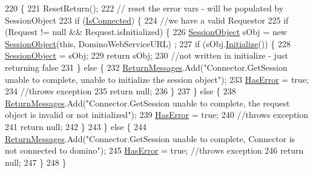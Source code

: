 \begin{DoxyCode}
220                                                                 \{
221         ResetReturn();
222         \textcolor{comment}{// reset the error vars - will be populated by SessionObject}
223         \textcolor{keywordflow}{if} (\mbox{\hyperlink{class_connector_a7e4bd5a6b59b228b169066b5f5ed4b0a}{IsConnected}}) \{
224             \textcolor{comment}{//we have a valid Requestor}
225             \textcolor{keywordflow}{if} (Request != null && Request.isInitialized) \{
226                 \mbox{\hyperlink{class_session_object}{SessionObject}} sObj = \textcolor{keyword}{new} \mbox{\hyperlink{class_connector_a0a7bb42f9530796c086ab50785147ce9}{SessionObject}}(\textcolor{keyword}{this}, DominoWebServiceURL)
      ;
227                 \textcolor{keywordflow}{if} (sObj.\mbox{\hyperlink{class_session_object_af3b9c9d56d98c848061952ed935f815b}{Initialize}}()) \{
228                     \mbox{\hyperlink{class_session_object}{SessionObject}} = sObj;
229                     \textcolor{keywordflow}{return} sObj;
230                     \textcolor{comment}{//not written in initialize - just returning false}
231                 \} \textcolor{keywordflow}{else} \{
232                     \mbox{\hyperlink{class_connector_a1ed422674b344524fd77998dcf6a9ba6}{ReturnMessages}}.Add(\textcolor{stringliteral}{"Connector.GetSession unable to complete, unable to
       initialize the session object"});
233                     \mbox{\hyperlink{class_connector_a9365777a6b7b711b75bcfa6c4d53e989}{HasError}} = \textcolor{keyword}{true};
234                     \textcolor{comment}{//throws exception}
235                     \textcolor{keywordflow}{return} null;
236                 \}
237             \} \textcolor{keywordflow}{else} \{
238                 \mbox{\hyperlink{class_connector_a1ed422674b344524fd77998dcf6a9ba6}{ReturnMessages}}.Add(\textcolor{stringliteral}{"Connector.GetSession unable to complete, the request
       object is invalid or not initialized"});
239                 \mbox{\hyperlink{class_connector_a9365777a6b7b711b75bcfa6c4d53e989}{HasError}} = \textcolor{keyword}{true};
240                 \textcolor{comment}{//throws exception}
241                 \textcolor{keywordflow}{return} null;
242             \}
243         \} \textcolor{keywordflow}{else} \{
244             \mbox{\hyperlink{class_connector_a1ed422674b344524fd77998dcf6a9ba6}{ReturnMessages}}.Add(\textcolor{stringliteral}{"Connector.GetSession unable to complete, Connector is not
       connected to domino"});
245             \mbox{\hyperlink{class_connector_a9365777a6b7b711b75bcfa6c4d53e989}{HasError}} = \textcolor{keyword}{true};  \textcolor{comment}{//throws exception}
246             \textcolor{keywordflow}{return} null;
247         \}
248     \}
\end{DoxyCode}
\mbox{\label{class_connector_a376c1ed70efd33d0bb18bb36e5cf076e}} 
